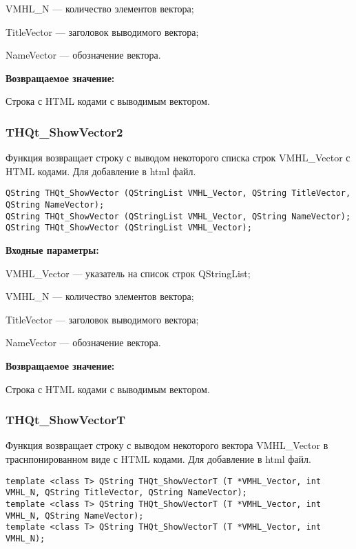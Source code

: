 \documentclass[a4paper,12pt]{article}
\begin{document}
    VMHL\_N --- количество элементов вектора;
 
    TitleVector --- заголовок выводимого вектора;
 
    NameVector --- обозначение вектора.

\textbf{Возвращаемое значение:}

Строка с HTML кодами с выводимым вектором.


\subsubsection{THQt\_ShowVector2}\label{THQt_ShowVector2}

Функция возвращает строку с выводом некоторого списка строк VMHL\_Vector с HTML кодами. Для добавление в html файл.


\begin{lstlisting}[label=code_syntax_THQt_ShowVector2,caption=Синтаксис]
QString THQt_ShowVector (QStringList VMHL_Vector, QString TitleVector, QString NameVector);
QString THQt_ShowVector (QStringList VMHL_Vector, QString NameVector);
QString THQt_ShowVector (QStringList VMHL_Vector);
\end{lstlisting}

\textbf{Входные параметры:}
 
VMHL\_Vector --- указатель на список строк QStringList;
 
    VMHL\_N --- количество элементов вектора;
 
    TitleVector --- заголовок выводимого вектора;
 
    NameVector --- обозначение вектора.

\textbf{Возвращаемое значение:}

Строка с HTML кодами с выводимым вектором.


\subsubsection{THQt\_ShowVectorT}\label{THQt_ShowVectorT}

Функция возвращает строку с выводом некоторого вектора VMHL\_Vector в траснпонированном виде с HTML кодами. Для добавление в html файл.


\begin{lstlisting}[label=code_syntax_THQt_ShowVectorT,caption=Синтаксис]
template <class T> QString THQt_ShowVectorT (T *VMHL_Vector, int VMHL_N, QString TitleVector, QString NameVector);
template <class T> QString THQt_ShowVectorT (T *VMHL_Vector, int VMHL_N, QString NameVector);
template <class T> QString THQt_ShowVectorT (T *VMHL_Vector, int VMHL_N);
\end{lstlisting}
\end{document}
